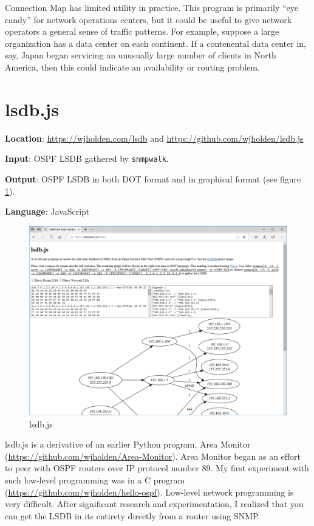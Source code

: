 \documentclass[12pt]{article}
\begin{document}
Connection Map has limited utility in practice. This program is primarily ``eye candy'' for network operations centers, but it could be useful to give network operators a general sense of traffic patterns. For example, suppose a large organization has a data center on each continent. If a contenental data center in, say, Japan began servicing an unusually large number of clients in North America, then this could indicate an availability or routing problem.

\section{lsdb.js}

\textbf{Location}: \url{https://wjholden.com/lsdb} and \url{https://github.com/wjholden/lsdb.js}

\textbf{Input}: OSPF LSDB gathered by \texttt{snmpwalk}.

\textbf{Output}: OSPF LSDB in both DOT format and in graphical format (see figure \ref{fig:lsdb}).

\textbf{Language}: JavaScript

\begin{figure}[h]
\centering
\includegraphics[width=\textwidth]{lsdb.PNG}
\caption{lsdb.js}
\label{fig:lsdb}
\end{figure}

lsdb.js is a derivative of an earlier Python program, Area Monitor (\url{https://github.com/wjholden/Area-Monitor}). Area Monitor began as an effort to peer with OSPF routers over IP protocol number 89. My first experiment with such low-level programming was in a C program (\url{https://github.com/wjholden/hello-ospf}). Low-level network programming is very difficult. After significant research and experimentation, I realized that you can get the LSDB in its entirety directly from a router using SNMP.
\end{document}
